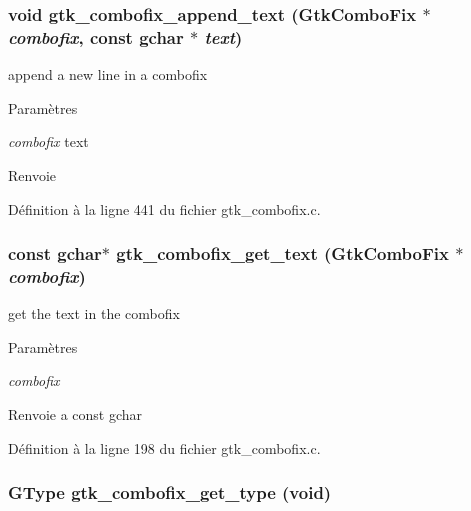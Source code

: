 \subsubsection[{gtk\_\-combofix\_\-append\_\-text}]{\setlength{\rightskip}{0pt plus 5cm}void gtk\_\-combofix\_\-append\_\-text ({\bf GtkComboFix} $\ast$ {\em combofix}, \/  const gchar $\ast$ {\em text})}\label{gtk__combofix_8h_a18cf71b93180a5a0699f90ed7d76e32c}
append a new line in a combofix


\begin{DoxyParams}{Paramètres}
\item[{\em combofix}]text\end{DoxyParams}
\begin{DoxyReturn}{Renvoie}

\end{DoxyReturn}


Définition à la ligne 441 du fichier gtk\_\-combofix.c.

\subsubsection[{gtk\_\-combofix\_\-get\_\-text}]{\setlength{\rightskip}{0pt plus 5cm}const gchar$\ast$ gtk\_\-combofix\_\-get\_\-text ({\bf GtkComboFix} $\ast$ {\em combofix})}\label{gtk__combofix_8h_a957ebcb179fe43537f34c0e4134dc182}
get the text in the combofix


\begin{DoxyParams}{Paramètres}
\item[{\em combofix}]\end{DoxyParams}
\begin{DoxyReturn}{Renvoie}
a const gchar 
\end{DoxyReturn}


Définition à la ligne 198 du fichier gtk\_\-combofix.c.

\subsubsection[{gtk\_\-combofix\_\-get\_\-type}]{\setlength{\rightskip}{0pt plus 5cm}GType gtk\_\-combofix\_\-get\_\-type (void)}\label{gtk__combofix_8h_ad9d924e04ce8ac3bf0f6d0c67577f287}

